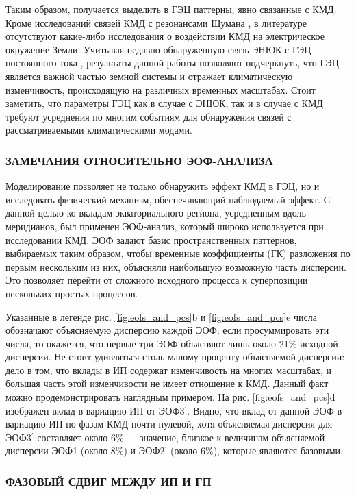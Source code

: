 Таким образом, получается выделить в ГЭЦ паттерны, явно связанные с КМД. Кроме исследований связей КМД с резонансами Шумана \cite{Anyamba_et_al_2000, Beggan_Musur_2019}, в литературе отсутствуют какие-либо исследования о воздействии КМД на электрическое окружение Земли. Учитывая недавно обнаруженную связь ЭНЮК с ГЭЦ постоянного тока \cite{Harrison_et_al_2011, Slyunyaev_et_al_2021a, Slyunyaev_et_al_2021b, Slyunyaev_et_al_2021c}, результаты данной работы позволяют подчеркнуть, что ГЭЦ является важной частью земной системы и отражает климатическую изменчивость, происходящую на различных временных масштабах. Стоит заметить, что параметры ГЭЦ как в случае с ЭНЮК, так и в случае с КМД требуют усреднения по многим событиям для обнаружения связей с рассматриваемыми климатическими модами.

\subsubsection{ЗАМЕЧАНИЯ ОТНОСИТЕЛЬНО ЭОФ-АНАЛИЗА}

Моделирование позволяет не только обнаружить эффект КМД в ГЭЦ, но и исследовать физический механизм, обеспечивающий наблюдаемый эффект. С данной целью ко вкладам экваториального региона, усредненным вдоль меридианов, был применен ЭОФ-анализ, который широко используется при исследовании КМД. ЭОФ задают базис пространственных паттернов, выбираемых таким образом, чтобы временные коэффициенты (ГК) разложения по первым нескольким из них, объясняли наибольшую возможную часть дисперсии. Это позволяет перейти от сложного исходного процесса к суперпозиции нескольких простых процессов.

Указанные в легенде рис. \ref{fig:eofs_and_pcs}{b} и \ref{fig:eofs_and_pcs}{e} числа обозначают объясняемую дисперсию каждой ЭОФ; если просуммировать эти числа, то окажется, что первые три ЭОФ объясняют лишь около 21\% исходной дисперсии. Не стоит удивляться столь малому проценту объясняемой дисперсии: дело в том, что вклады в ИП содержат изменчивость на многих масштабах, и большая часть этой изменчивости не имеет отношение к КМД. Данный факт можно продемонстрировать наглядным примером. На рис. \ref{fig:eofs_and_pcs}{d} изображен вклад в вариацию ИП от ЭОФ3$^\prime$. Видно, что вклад от данной ЭОФ в вариацию ИП по фазам КМД почти нулевой, хотя объясняемая дисперсия для ЭОФ3$^\prime$ составляет около 6\% --- значение, близкое к величинам объясняемой дисперсии ЭОФ1 (около 8\%) и ЭОФ2$^\prime$ (около 6\%), которые являются базовыми.

\subsubsection{ФАЗОВЫЙ СДВИГ МЕЖДУ ИП И ГП}
\label{sec:phase_shift}

